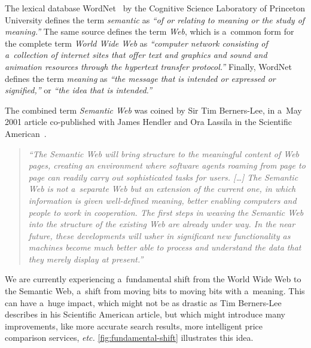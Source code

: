 The lexical database
WordNet~\cite{fellbaum1998wordnet,miller1995wordnet}
by the Cognitive Science Laboratory
of Princeton University defines the term \emph{semantic}
as \emph{``of or relating to meaning or the study of meaning.''}
The same source defines the term \emph{Web},
which is a~common form for the complete term
\emph{World Wide Web} as
\emph{``computer network consisting of a~collection of internet sites that offer text and graphics and
sound and animation resources through the hypertext
transfer protocol.''}
Finally, WordNet defines the term \emph{meaning}
as \emph{``the message that is intended or expressed
or signified,''} or \emph{``the idea that is intended.''}

The combined term \emph{Semantic Web} was coined
by Sir Tim Berners-Lee,
in a~May 2001 article co-published with James Hendler
and Ora Lassila
in the Scientific American~\cite{bernerslee2001semanticweb}.

\begin{quotation}
\textit{``The Semantic Web will bring structure to the meaningful
content of Web pages,
creating an environment where software agents
roaming from page to page
can readily carry out sophisticated tasks for users. [\ldots]
The Semantic Web is not a~separate Web
but an extension of the current one,
in which information is given well-defined meaning,
better enabling computers and people
to work in cooperation.
The first steps in weaving the Semantic Web
into the structure of the existing Web
are already under way.
In the near future, these developments
will usher in significant new functionality
as machines become much better able to process and \emph{understand} the data
that they merely display at present.''}
\end{quotation}

We are currently experiencing a~fundamental shift
from the World Wide Web to the Semantic Web,
a~shift from moving bits to moving bits with a~meaning.
This can have a~huge impact,
which might not be as drastic as Tim Berners-Lee describes
in his Scientific American article,
but which might introduce many improvements,
like more accurate search results,
more intelligent price comparison services, \emph{etc.}
\autoref{fig:fundamental-shift} illustrates this idea.

